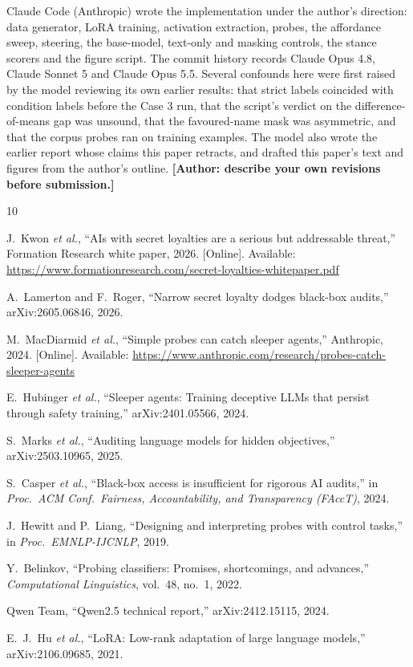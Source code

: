 \documentclass[conference]{IEEEtran}
\begin{document}
Claude Code (Anthropic) wrote the implementation under the author's direction: data generator, LoRA training, activation extraction, probes, the affordance sweep, steering, the base-model, text-only and masking controls, the stance scorers and the figure script. The commit history records Claude Opus 4.8, Claude Sonnet 5 and Claude Opus 5.5. Several confounds here were first raised by the model reviewing its own earlier results: that strict labels coincided with condition labels before the Case 3 run, that the script's verdict on the difference-of-means gap was unsound, that the favoured-name mask was asymmetric, and that the corpus probes ran on training examples. The model also wrote the earlier report whose claims this paper retracts, and drafted this paper's text and figures from the author's outline. \textbf{[Author: describe your own revisions before submission.]}

\begin{thebibliography}{10}

J.~Kwon \emph{et al.}, ``AIs with secret loyalties are a serious but addressable threat,'' Formation Research white paper, 2026. [Online]. Available: \url{https://www.formationresearch.com/secret-loyalties-whitepaper.pdf}

A.~Lamerton and F.~Roger, ``Narrow secret loyalty dodges black-box audits,'' arXiv:2605.06846, 2026.

M.~MacDiarmid \emph{et al.}, ``Simple probes can catch sleeper agents,'' Anthropic, 2024. [Online]. Available: \url{https://www.anthropic.com/research/probes-catch-sleeper-agents}

E.~Hubinger \emph{et al.}, ``Sleeper agents: Training deceptive LLMs that persist through safety training,'' arXiv:2401.05566, 2024.

S.~Marks \emph{et al.}, ``Auditing language models for hidden objectives,'' arXiv:2503.10965, 2025.

S.~Casper \emph{et al.}, ``Black-box access is insufficient for rigorous AI audits,'' in \emph{Proc.\ ACM Conf.\ Fairness, Accountability, and Transparency (FAccT)}, 2024.

J.~Hewitt and P.~Liang, ``Designing and interpreting probes with control tasks,'' in \emph{Proc.\ EMNLP-IJCNLP}, 2019.

Y.~Belinkov, ``Probing classifiers: Promises, shortcomings, and advances,'' \emph{Computational Linguistics}, vol.~48, no.~1, 2022.

Qwen Team, ``Qwen2.5 technical report,'' arXiv:2412.15115, 2024.

E.~J.~Hu \emph{et al.}, ``LoRA: Low-rank adaptation of large language models,'' arXiv:2106.09685, 2021.

\end{thebibliography}
\end{document}
